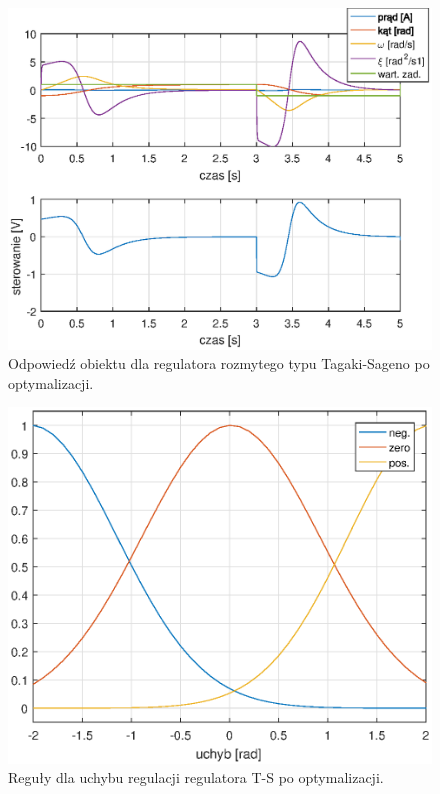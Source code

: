 \begin{figure}[h!]
	\centering
	\includegraphics[scale = 0.8]{fig/fuzzy_sagenoOpt_odp.eps}
	\caption		
	{Odpowied\'z obiektu dla regulatora rozmytego typu Tagaki-Sageno po optymalizacji.}
	\label{fuzzy_sageno_odp}
\end{figure}

\begin{figure}[h!]
	\centering
	\includegraphics[scale = 0.8]{fig/e_rules_sageno.eps}
	\caption		
	{Reguły dla uchybu regulacji regulatora T-S po optymalizacji.}
	\label{fuzzy_sageno_e_rulles}
\end{figure}

